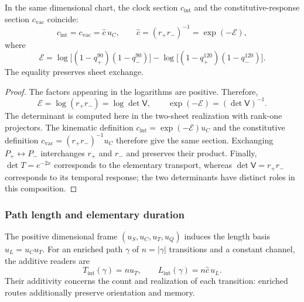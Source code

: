 \begin{proposition}
\label{v:v:prop:identidad-velocidad}
In the same dimensional chart, the clock section $c_{\mathrm{int}}$
and the constitutive-response section $c_{\mathrm{vac}}$ coincide:
\begin{equation}
 c_{\mathrm{int}}=c_{\mathrm{vac}}
   =\widehat c\,u_C,
 \qquad
 \widehat c=(r_+r_-)^{-1}
            =\exp(-\mathcal E),
 \label{v:v:eq:identidad-velocidad}
\end{equation}
where
\begin{equation}
 \mathcal E=
 \log\!\bigl[(1-q_+^{90})(1-q_-^{90})\bigr]
 -\log\!\bigl[(1-q_+^{120})(1-q_-^{120})\bigr].
 \label{v:v:eq:velocidad-lector-simetrico}
\end{equation}
The equality preserves sheet exchange.
\end{proposition}
\begin{proof}
The factors appearing in the logarithms are positive. Therefore,
\[
 \mathcal E=\log(r_+r_-)
            =\log\det\mathsf V,
 \qquad \exp(-\mathcal E)=(\det\mathsf V)^{-1}.
\]
The determinant is computed here in the two-sheet realization with rank-one
projectors. The kinematic definition $c_{\mathrm{int}}=\exp(-\mathcal E)u_C$
and the constitutive definition $c_{\mathrm{vac}}=(r_+r_-)^{-1}u_C$
therefore give the same section. Exchanging $P_+\leftrightarrow
P_-$ interchanges $r_+$ and $r_-$ and preserves their product. Finally,
$\det T=e^{-2x}$ corresponds to the elementary transport, whereas
$\det\mathsf V=r_+r_-$ corresponds to its temporal response; the two
determinants have distinct roles in this composition.
\end{proof}

\subsubsection{Path length and elementary duration}

The positive dimensional frame $(u_S,u_C,u_T,u_Q)$ induces the length
basis $u_L=u_Cu_T$. For an enriched path $\gamma$ of
$n=|\gamma|$ transitions and a constant channel, the additive readers are
\begin{equation}
 T_{\mathrm{int}}(\gamma)=n u_T,
 \qquad L_{\mathrm{int}}(\gamma)=n\widehat c\,u_L.
 \label{v:v:eq:velocidad-longitud-reloj}
\end{equation}
Their additivity concerns the count and realization of each transition:
enriched routes additionally preserve orientation and memory.

